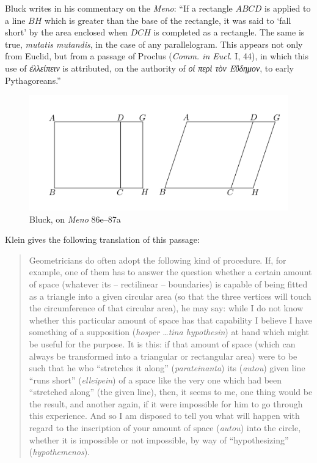 \documentclass{article}
\begin{document}
Bluck \cite[p.~442]{bluck} writes in his commentary on the {\em Meno}: ``If a rectangle $ABCD$ is applied to a line $BH$ which is 
greater than the base of the rectangle, it was said to `fall short' by the area enclosed when $DCH$ is completed
as a rectangle. The same is true, {\em mutatis mutandis}, in the case of any parallelogram. This appears
not only from Euclid, but from a passage of Proclus ({\em Comm. in Eucl.} I, 44), in which this use of
{\em ἐλλείπειν} is attributed, on the authority of {\em οί περὶ τὸν Εὒδημον}, to early Pythagoreans.''

\begin{figure}
\begin{center}
\includegraphics{bluck.png}
\end{center}
\caption{Bluck, on {\em Meno} 86e--87a}
\label{bluck}
\end{figure}

Klein \cite[p.~206]{klein} gives the following translation of this passage:

\begin{quote}
Geometricians do often adopt the following kind of procedure. If, for example, one of them has to answer the question whether a certain amount of space (whatever its -- rectilinear -- boundaries) is capable of being fitted as a triangle into a given circular area (so that the three vertices will touch the circumference of that circular area), he may say: while I do not know whether this particular amount of space has that capability I believe I have something of a supposition ({\em hosper \dots tina hypothesin}) at hand which might be useful for the purpose. It is this: if that amount of space (which can always be transformed into a triangular or rectangular area) were to be such that he who ``stretches it along'' ({\em parateinanta}) its
({\em autou}) given line ``runs short'' ({\em elleipein}) of a space like the very one which had been ``stretched along'' (the given line), then, it seems to me, one thing would be the result, and another again, if it were impossible for him to go through this experience. And so I am disposed to tell you what will happen with regard to the inscription of your amount of space ({\em autou}) into the circle, whether it is impossible or not impossible, by way of ``hypothesizing'' ({\em hypothemenos}).
\end{quote}
\end{document}
